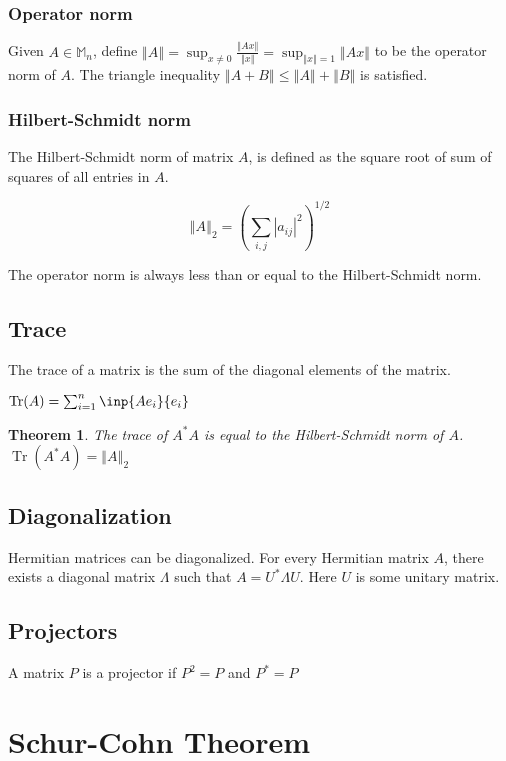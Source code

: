 \documentclass[twofold]{article}
\newcommand*\adj[1]{#1^*}
\newcommand*\norm[1]{\left \Vert #1 \right\Vert}
\newcommand*\abs[1]{\left \vert #1 \right\vert}
\DeclareMathOperator{\Tr}{Tr}
\theoremstyle{plain}
\newtheorem*{theorem}{Theorem}
\theoremstyle{definition}
\begin{document}
\subsubsection{Operator norm}
Given \(A \in \mathbb{M}_n\), define \(\norm{A} =\displaystyle \sup _{x \neq 0} \frac{\norm{Ax}}{\norm{x}} = \sup_{\norm{x} = 1} \norm{Ax} \) to be the operator norm of \(A\). The triangle inequality \(\norm{A + B} \leq \norm{A} + \norm{B}\) is satisfied. 

\subsubsection{Hilbert-Schmidt norm}

The Hilbert-Schmidt norm of matrix \(A\), is defined as the square root of sum of squares of all entries in \(A\). 

 \[\norm{A}_2 = \left( \sum_{i, j} \abs{a_{ij}}^2 \right) ^{1/2}\]


The operator norm is always less than or equal to the Hilbert-Schmidt norm.

\subsection{Trace}
The trace of a matrix is the sum of the diagonal elements of the matrix. 

\(\Tr(A) = \sum_{i=1} ^n \inp{Ae_i}{ e_i}\)

\begin{theorem}The trace of \(\adj{A}A\) is equal to the Hilbert-Schmidt norm of \(A\). \(\Tr( \adj{A} A ) = \norm{A}_2\)\end{theorem}

\subsection{Diagonalization}

Hermitian matrices can be diagonalized. For every Hermitian matrix \(A\), there exists a diagonal matrix \(\Lambda\) such that \(A = \adj{U}  \Lambda U\). Here \(U\) is some unitary matrix. 


\subsection{Projectors}
A matrix \(P\) is a projector if \(P^2 = P\) and \(\adj{P} = P\)



\section{Schur-Cohn Theorem}
\end{document}
